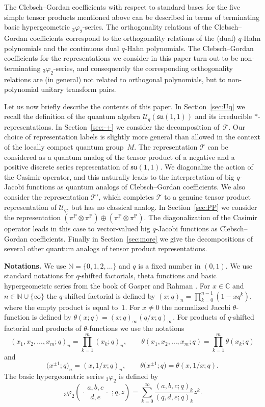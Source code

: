 \documentclass[pdftex]{sigma}
\numberwithin{equation}{section}
\numberwithin{theorem}{section}
\numberwithin{proposition}{section}
\numberwithin{lemma}{section}
\numberwithin{corollary}{section}
\numberwithin{definition}{section}
\numberwithin{example}{section}
\numberwithin{remark}{section}
\numberwithin{note}{section}
\newcommand{\N}{\mathbb N}
\newcommand{\C}{\mathbb C}
\newcommand{\rphis}[5]{\,_{#1}\varphi_{#2} \left( \genfrac{.}{.}{0pt}{}{#3}{#4}
\ ;#5 \right)}
\newcommand{\su}{\mathfrak{su}}
\newcommand{\U}{\mathcal U}
\begin{document}
The Clebsch--Gordan coef\/f\/icients with respect to standard bases for the f\/ive simple tensor products mentioned above can be described in terms of terminating basic hypergeometric $_3\varphi_2$-series. The orthogonality relations of the Clebsch--Gordan coef\/f\/icients correspond to the orthogonality relations of the (dual) $q$-Hahn polynomials and the continuous dual $q$-Hahn polynomials. The Clebsch--Gordan coef\/f\/icients for the representations we consider in this paper turn out to be non-terminating $_3\varphi_2$-series, and consequently the corresponding orthogonality relations are (in general) not related to orthogonal polynomials, but to non-polynomial unitary transform pairs.

Let us now brief\/ly describe the contents of this paper. In Section~\ref{sec:Uq} we recall the def\/inition of the quantum algebra $\U_q(\su(1,1))$ and its irreducible $*$-representations. In Section~\ref{sec:-+} we consider the decomposition of~$\mathcal T$. Our choice of representation labels is slightly more general than allowed in the context of the locally compact quantum group~$M$. The representation $\mathcal T$ can be considered as a quantum analog of the tensor product of a negative and a positive discrete series representation of $\su(1,1)$. We diagonalize the action of the Casimir operator, and this naturally leads to the interpretation of big $q$-Jacobi functions as quantum analogs of Clebsch--Gordan coef\/f\/icients. We also consider the representation $\mathcal T'$, which completes $\mathcal T$ to a genuine tensor product representation of $\U_q$, but has no classical analog. In Section~\ref{sec:PP} we consider the representation $(\pi^{\mathrm{P}} \otimes \pi^{\mathrm{P}}) \oplus (\pi^{\mathrm{P}} \otimes \pi^{\mathrm{P}})$. The diagonalization of the Casimir operator leads in this case to vector-valued big $q$-Jacobi functions as Clebsch--Gordan coef\/f\/icients. Finally in Section~\ref{sec:more} we give the decompositions of several other quantum analogs of tensor product representations.



\textbf{Notations.}
We use $\N=\{0,1,2,\ldots\}$ and $q$ is a f\/ixed number in $(0,1)$. We use standard notations for $q$-shifted factorials, theta functions and basic hypergeometric series from the book of Gasper and Rahman \cite{GRa04}. For $x \in \C$ and $n \in \N \cup \{\infty\}$ the $q$-shifted factorial is def\/ined by $(x;q)_n = \prod\limits_{k=0}^{n-1} (1-xq^{k})$, where the empty product is equal to~$1$. For $x \neq 0$ the normalized Jacobi $\theta$-function is def\/ined by $\theta(x;q)=(x;q)_\infty (q/x;q)_\infty$. For products of $q$-shifted factorial and products of $\theta$-functions we use the notations
\[
(x_1,x_2,\ldots,x_m;q)_n=\prod_{k=1}^m (x_k;q)_n, \qquad  \theta(x_1,x_2,\ldots,x_m;q)= \prod_{k=1}^m \theta(x_k;q)
\]
and
\[
\big(x^{\pm 1};q\big)_n = (x,1/x;q)_n, \qquad   \theta\big(x^{\pm 1};q\big) = \theta(x,1/x;q).
\]
The basic hypergeometric series $_3\varphi_2$ is def\/ined by
\[
\rphis{3}{2}{a,b,c}{d,e}{q,z} = \sum_{k=0}^\infty \frac{ (a,b,c;q)_k }{ (q,d,e;q)_k } z^k.
\]
\end{document}
